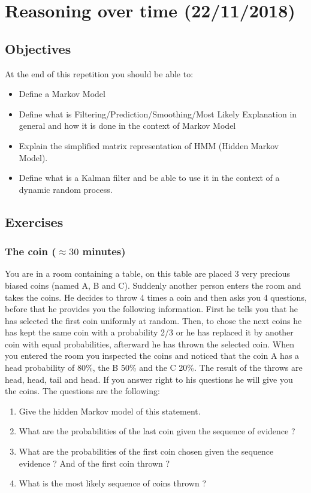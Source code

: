 \documentclass[a4paper, 10pt]{article}
\begin{document}


   \setcounter{page}{1}
   \section{Reasoning over time (22/11/2018)}
   
   \subsection{Objectives}
   At the end of this repetition you should be able to:
   \begin{itemize}
       \item Define a Markov Model
       \item Define what is Filtering/Prediction/Smoothing/Most Likely Explanation in general and how it is done in the context of Markov Model
       \item Explain the simplified matrix representation of HMM (Hidden Markov Model).
       \item Define what is a Kalman filter and be able to use it in the context of a dynamic random process.
   \end{itemize}
   \subsection{Exercises }
   \subsubsection{The coin ($\approx 30$ minutes)}
   You are in a room containing a table, on this table are placed 3 very precious biased coins (named A, B and C). Suddenly another person enters the room and takes the coins. He decides to throw 4 times a coin and then asks you 4 questions, before that he provides you the following information. First he tells you that he has selected the first coin uniformly at random. Then, to chose the next coins he has kept the same coin with a probability 2/3 or he has replaced it by another coin with equal probabilities, afterward he has thrown the selected coin. When you entered the room you inspected the coins and noticed that the coin A has a head probability of 80\%, the B 50\% and the C 20\%. The result of the throws are head, head, tail and head. 
   If you answer right to his questions he will give you the coins. The questions are the following:
   \begin{enumerate}
       \item Give the hidden Markov model of this statement.
       \item What are the probabilities of the last coin given the sequence of evidence ?
       \item What are the probabilities of the first coin chosen given the sequence evidence ? And of the first coin thrown ?
       \item What is the most likely sequence of coins thrown ?
       
   \end{enumerate}
\end{document}
